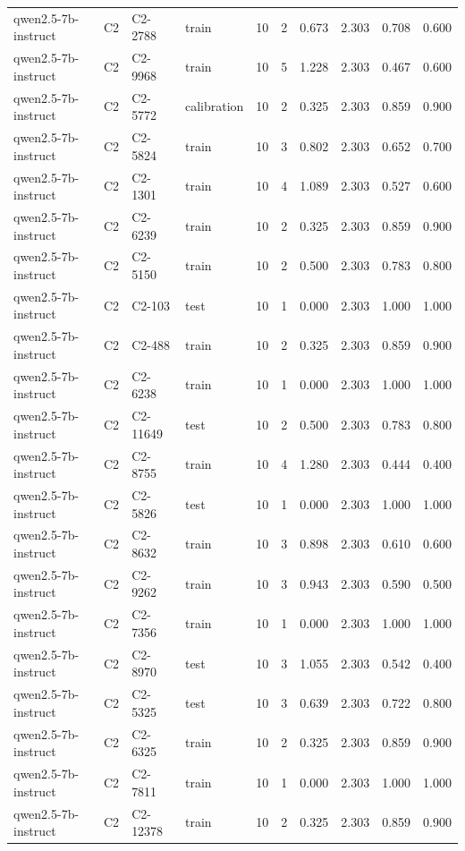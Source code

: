\begin{table}
\begin{tabular}{llllrrrrrr}
qwen2.5-7b-instruct & C2 & C2-2788 & train & 10 & 2 & 0.673 & 2.303 & 0.708 & 0.600 \\
qwen2.5-7b-instruct & C2 & C2-9968 & train & 10 & 5 & 1.228 & 2.303 & 0.467 & 0.600 \\
qwen2.5-7b-instruct & C2 & C2-5772 & calibration & 10 & 2 & 0.325 & 2.303 & 0.859 & 0.900 \\
qwen2.5-7b-instruct & C2 & C2-5824 & train & 10 & 3 & 0.802 & 2.303 & 0.652 & 0.700 \\
qwen2.5-7b-instruct & C2 & C2-1301 & train & 10 & 4 & 1.089 & 2.303 & 0.527 & 0.600 \\
qwen2.5-7b-instruct & C2 & C2-6239 & train & 10 & 2 & 0.325 & 2.303 & 0.859 & 0.900 \\
qwen2.5-7b-instruct & C2 & C2-5150 & train & 10 & 2 & 0.500 & 2.303 & 0.783 & 0.800 \\
qwen2.5-7b-instruct & C2 & C2-103 & test & 10 & 1 & 0.000 & 2.303 & 1.000 & 1.000 \\
qwen2.5-7b-instruct & C2 & C2-488 & train & 10 & 2 & 0.325 & 2.303 & 0.859 & 0.900 \\
qwen2.5-7b-instruct & C2 & C2-6238 & train & 10 & 1 & 0.000 & 2.303 & 1.000 & 1.000 \\
qwen2.5-7b-instruct & C2 & C2-11649 & test & 10 & 2 & 0.500 & 2.303 & 0.783 & 0.800 \\
qwen2.5-7b-instruct & C2 & C2-8755 & train & 10 & 4 & 1.280 & 2.303 & 0.444 & 0.400 \\
qwen2.5-7b-instruct & C2 & C2-5826 & test & 10 & 1 & 0.000 & 2.303 & 1.000 & 1.000 \\
qwen2.5-7b-instruct & C2 & C2-8632 & train & 10 & 3 & 0.898 & 2.303 & 0.610 & 0.600 \\
qwen2.5-7b-instruct & C2 & C2-9262 & train & 10 & 3 & 0.943 & 2.303 & 0.590 & 0.500 \\
qwen2.5-7b-instruct & C2 & C2-7356 & train & 10 & 1 & 0.000 & 2.303 & 1.000 & 1.000 \\
qwen2.5-7b-instruct & C2 & C2-8970 & test & 10 & 3 & 1.055 & 2.303 & 0.542 & 0.400 \\
qwen2.5-7b-instruct & C2 & C2-5325 & test & 10 & 3 & 0.639 & 2.303 & 0.722 & 0.800 \\
qwen2.5-7b-instruct & C2 & C2-6325 & train & 10 & 2 & 0.325 & 2.303 & 0.859 & 0.900 \\
qwen2.5-7b-instruct & C2 & C2-7811 & train & 10 & 1 & 0.000 & 2.303 & 1.000 & 1.000 \\
qwen2.5-7b-instruct & C2 & C2-12378 & train & 10 & 2 & 0.325 & 2.303 & 0.859 & 0.900 \\

\end{tabular}
\end{table}
